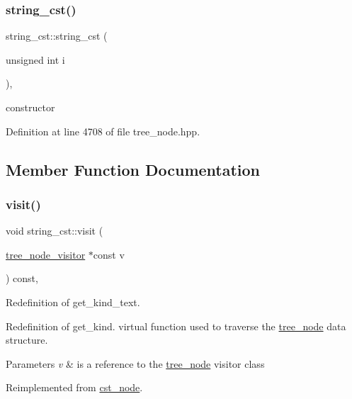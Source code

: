 \subsubsection{\texorpdfstring{string\+\_\+cst()}{string\_cst()}}
{\footnotesize\ttfamily string\+\_\+cst\+::string\+\_\+cst (\begin{DoxyParamCaption}\item[{unsigned int}]{i }\end{DoxyParamCaption})\hspace{0.3cm}{\ttfamily [inline]}, {\ttfamily [explicit]}}



constructor 



Definition at line 4708 of file tree\+\_\+node.\+hpp.



\subsection{Member Function Documentation}
\mbox{\label{structstring__cst_a45a7b808005d8535d6cdf939d6ac2fa5}} 
\subsubsection{\texorpdfstring{visit()}{visit()}}
{\footnotesize\ttfamily void string\+\_\+cst\+::visit (\begin{DoxyParamCaption}\item[{\hyperlink{classtree__node__visitor}{tree\+\_\+node\+\_\+visitor} $\ast$const}]{v }\end{DoxyParamCaption}) const\hspace{0.3cm}{\ttfamily [override]}, {\ttfamily [virtual]}}



Redefinition of get\+\_\+kind\+\_\+text. 

Redefinition of get\+\_\+kind. virtual function used to traverse the \hyperlink{classtree__node}{tree\+\_\+node} data structure. 
\begin{DoxyParams}{Parameters}
{\em v} & is a reference to the \hyperlink{classtree__node}{tree\+\_\+node} visitor class \\
\hline
\end{DoxyParams}


Reimplemented from \hyperlink{structcst__node_a64e2bc20ffda1b13ffe894cacb982f89}{cst\+\_\+node}.



